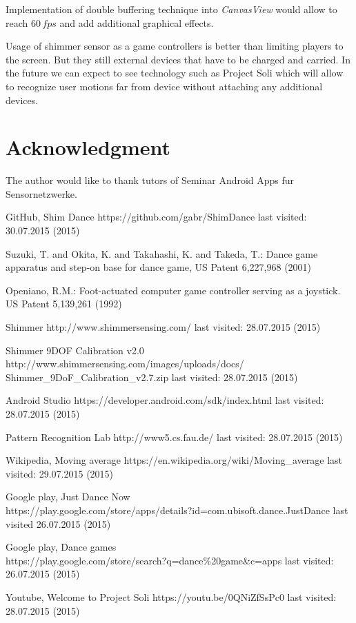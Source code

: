 \documentclass[conference]{IEEEtran}
\begin{document}
Implementation of double buffering technique into \emph{CanvasView} would allow to reach $60\,fps$ and add additional graphical effects.

Usage of shimmer sensor as a game controllers is better than limiting players to the screen. But they still external devices that have to be charged and carried.
In the future we can expect to see technology such as Project Soli which will allow to recognize user motions far from device without attaching any additional devices\cite{ProjectSoli}.


\section*{Acknowledgment}
The author would like to thank tutors of Seminar Android
Apps fur Sensornetzwerke.

\begin{thebibliography}{5}

GitHub, Shim Dance {https://github.com/gabr/ShimDance} last visited: 30.07.2015 (2015)

Suzuki, T. and Okita, K. and Takahashi, K. and Takeda, T.: {Dance game apparatus and step-on base for dance game}, US Patent 6,227,968 (2001)

Openiano, R.M.: {Foot-actuated computer game controller serving as a joystick}. US Patent 5,139,261 (1992)

Shimmer {http://www.shimmersensing.com/} last visited: 28.07.2015 (2015)

Shimmer 9DOF Calibration v2.0\\{http://www.shimmersensing.com/images/uploads/docs/\\Shimmer\_9DoF\_Calibration\_v2.7.zip} last visited: 28.07.2015 (2015)

Android Studio {https://developer.android.com/sdk/index.html} last visited: 28.07.2015 (2015)

Pattern Recognition Lab {http://www5.cs.fau.de/} last visited: 28.07.2015 (2015)

Wikipedia, Moving average {https://en.wikipedia.org/wiki/Moving\_average} last visited: 29.07.2015 (2015)

Google play, Just Dance Now\\{https://play.google.com/store/apps/details?id=com.ubisoft.dance.JustDance} last visited 26.07.2015 (2015)

Google play, Dance games\\{https://play.google.com/store/search?q=dance\%20game\&c=apps} last visited: 26.07.2015 (2015)

Youtube, Welcome to Project Soli {https://youtu.be/0QNiZfSsPc0} last visited: 28.07.2015 (2015)

\end{thebibliography}

\end{document}
